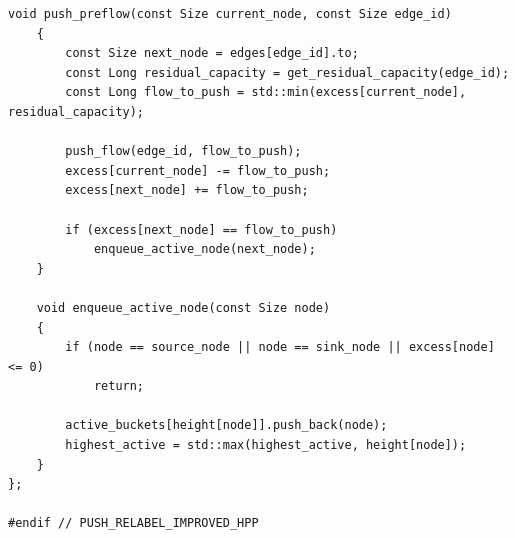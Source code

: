 \begin{lstlisting}[caption={Implementação em C++ da classe \lstinline{PushRelabelImproved}, otimizada empiricamente com a Heurística de Lacuna (\textit{Gap Heuristic}).}, label={lst:push_relabel_improved}]
	void push_preflow(const Size current_node, const Size edge_id)
	{
		const Size next_node = edges[edge_id].to;
		const Long residual_capacity = get_residual_capacity(edge_id);
		const Long flow_to_push = std::min(excess[current_node], residual_capacity);

		push_flow(edge_id, flow_to_push);
		excess[current_node] -= flow_to_push;
		excess[next_node] += flow_to_push;

		if (excess[next_node] == flow_to_push)
			enqueue_active_node(next_node);
	}

	void enqueue_active_node(const Size node)
	{
		if (node == source_node || node == sink_node || excess[node] <= 0)
			return;

		active_buckets[height[node]].push_back(node);
		highest_active = std::max(highest_active, height[node]);
	}
};

#endif // PUSH_RELABEL_IMPROVED_HPP
\end{lstlisting}
